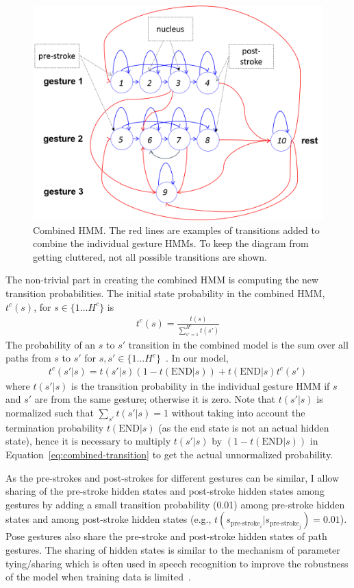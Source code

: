 \begin{figure}[!tbh]
\centering
\includegraphics[width=0.9\columnwidth]{figures/combined_hmm.png}
\caption{Combined HMM. The red lines are examples of transitions added to
combine the individual gesture HMMs.
To keep the diagram from getting cluttered, not all possible transitions are shown.}
\label{fig:combined-hmm}
\end{figure}

The non-trivial part in creating the combined HMM is computing the new 
transition probabilities. The initial state probability in the combined
HMM, $t^c(s)$, for $s\in\{1\ldots H^c\}$ is
\begin{align*}
t^c(s) = \frac{t(s)}{\sum_{s'=1}^{H^c} t(s')}
\end{align*}
The probability of an $s$ to $s'$ transition
in the combined model is the sum over all paths from $s$ to
$s'$ for $s, s'\in\{1\ldots H^c\}$~\cite{murphy02}. In our model, 
\begin{align}
t^c(s'|s) = t(s' | s) (1-t(\text{END}|s)) +
t(\text{END}|s)t^c(s')
\label{eq:combined-transition}
\end{align}
where $t(s'|s)$ is the transition probability in the individual gesture HMM if
$s$ and $s'$ are from the same gesture; otherwise it is zero. Note that
$t(s'|s)$ is normalized such that $\sum_{s'}t(s'|s) = 1$ without taking into
account the termination probability $t(\text{END}|s)$ (as the end state is not
an actual hidden state), hence it is necessary to multiply $t(s'|s)$ by $
(1-t(\text{END}|s))$ in Equation~\ref{eq:combined-transition} to get the actual
unnormalized probability.

As the pre-strokes and post-strokes for different gestures can be similar, I
allow sharing of the pre-stroke hidden states and post-stroke hidden states
among gestures by adding a small transition probability (0.01) among pre-stroke
hidden states and among post-stroke hidden states (e.g.,
$t(s_{\text{pre-stroke}_i} | s_{\text{pre-stroke}_j}) = 0.01$).
Pose gestures also share the pre-stroke and post-stroke hidden states of path
gestures. The sharing of hidden states is similar to the mechanism of parameter
tying/sharing which is often used in speech recognition to improve the
robustness of the model when training data is limited~\cite{young1994}.

